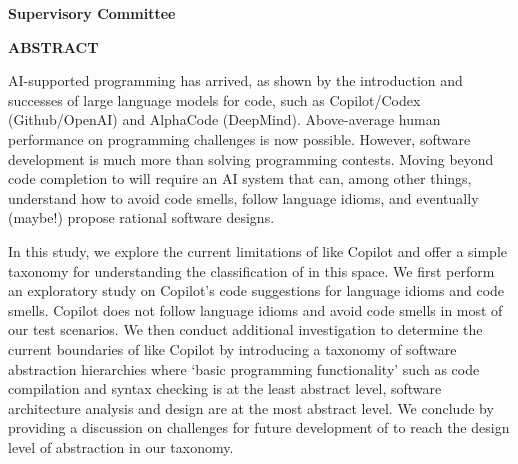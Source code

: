 \newpage
{}

\noindent \textbf{Supervisory Committee}
\tpbreak
\panel

\begin{center}
\textbf{ABSTRACT}
\end{center}

AI-supported programming has arrived, as shown by the introduction and successes of large language models for code, such as Copilot/Codex (Github/OpenAI) and AlphaCode (DeepMind). Above-average human performance on programming challenges is now possible. 
However, software development is much more than solving programming contests. 
Moving beyond code completion to \AISE{} will require an AI system that can, among other things, understand how to avoid code smells, follow language idioms, and eventually (maybe!) propose rational software designs.

In this study, we explore the current limitations of \cct{} like Copilot and offer a simple taxonomy for understanding the classification of \cct{} in this space.
We first perform an exploratory study on Copilot’s code suggestions for language idioms and code smells. Copilot does not follow language idioms and avoid code smells in most of our test scenarios. We then conduct additional investigation to determine the current boundaries of \cct{} like Copilot by introducing a taxonomy of software abstraction hierarchies where ‘basic programming functionality’ such as code compilation and syntax checking is at the least abstract level, software architecture analysis and design are at the most abstract level.
We conclude by providing a discussion on challenges for future development of \cct{} to reach the design level of abstraction in our taxonomy.


